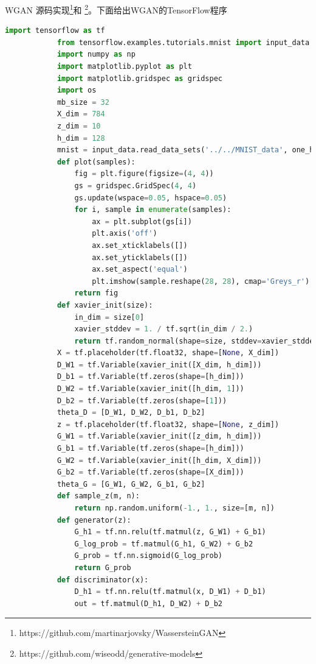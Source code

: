             \par
            WGAN 源码实现\footnote{https://github.com/martinarjovsky/WassersteinGAN}和
            \footnote{https://github.com/wiseodd/generative-models}。下面给出WGAN的TensorFlow程序
            \begin{lstlisting}[language = Python]
            import tensorflow as tf
            from tensorflow.examples.tutorials.mnist import input_data
            import numpy as np
            import matplotlib.pyplot as plt
            import matplotlib.gridspec as gridspec
            import os
            mb_size = 32
            X_dim = 784
            z_dim = 10
            h_dim = 128
            mnist = input_data.read_data_sets('../../MNIST_data', one_hot=True)
            def plot(samples):
                fig = plt.figure(figsize=(4, 4))
                gs = gridspec.GridSpec(4, 4)
                gs.update(wspace=0.05, hspace=0.05)
                for i, sample in enumerate(samples):
                    ax = plt.subplot(gs[i])
                    plt.axis('off')
                    ax.set_xticklabels([])
                    ax.set_yticklabels([])
                    ax.set_aspect('equal')
                    plt.imshow(sample.reshape(28, 28), cmap='Greys_r')
                return fig
            def xavier_init(size):
                in_dim = size[0]
                xavier_stddev = 1. / tf.sqrt(in_dim / 2.)
                return tf.random_normal(shape=size, stddev=xavier_stddev)
            X = tf.placeholder(tf.float32, shape=[None, X_dim])
            D_W1 = tf.Variable(xavier_init([X_dim, h_dim]))
            D_b1 = tf.Variable(tf.zeros(shape=[h_dim]))
            D_W2 = tf.Variable(xavier_init([h_dim, 1]))
            D_b2 = tf.Variable(tf.zeros(shape=[1]))
            theta_D = [D_W1, D_W2, D_b1, D_b2]
            z = tf.placeholder(tf.float32, shape=[None, z_dim])
            G_W1 = tf.Variable(xavier_init([z_dim, h_dim]))
            G_b1 = tf.Variable(tf.zeros(shape=[h_dim]))
            G_W2 = tf.Variable(xavier_init([h_dim, X_dim]))
            G_b2 = tf.Variable(tf.zeros(shape=[X_dim]))
            theta_G = [G_W1, G_W2, G_b1, G_b2]
            def sample_z(m, n):
                return np.random.uniform(-1., 1., size=[m, n])
            def generator(z):
                G_h1 = tf.nn.relu(tf.matmul(z, G_W1) + G_b1)
                G_log_prob = tf.matmul(G_h1, G_W2) + G_b2
                G_prob = tf.nn.sigmoid(G_log_prob)
                return G_prob
            def discriminator(x):
                D_h1 = tf.nn.relu(tf.matmul(x, D_W1) + D_b1)
                out = tf.matmul(D_h1, D_W2) + D_b2

\end{lstlisting}
